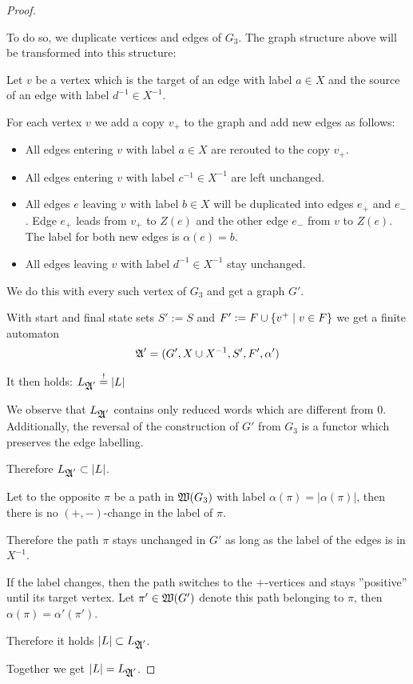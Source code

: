 \begin{proof}
\begin{center}

\end{center}

To do so, we duplicate vertices and edges of $G_3$. The graph structure
above will be transformed into this structure:

\begin{center}

\end{center}

Let $v$ be a vertex which is the target of an edge with label $a \in X$ and the
source of an edge with label $d^{-1} \in X^{-1}$.

For each vertex $v$ we add a copy $v_{+}$ to the graph and add new edges as
follows:
\begin{itemize}
  \item All edges entering $v$ with label $a \in X$ are rerouted to the copy
  $v_{+}$.
  \item All edges entering $v$ with label $c^{-1} \in X^{-1}$ are left
  unchanged.
  \item All edges $e$ leaving $v$ with label $b \in X$ will be
  duplicated into edges $e_{+}$ and $e_{-}$. Edge $e_{+}$ leads from $v_{+}$
  to $Z(e)$ and the other edge $e_{-}$ from $v$ to $Z(e)$. The label for
  both new edges is $\alpha(e) = b$.
	\item All edges leaving $v$ with label $d^{-1} \in X^{-1}$ stay unchanged.
\end{itemize}
We do this with every such vertex of $G_3$ and get a graph $G'$.

With start and final state sets $S' := S$ and $F' := F \cup \mbox{$\{v^+ \mid v
\in F\}$}$ we get a finite automaton
\[ \mbox{$\mathfrak{A}$}' = (G', X \cup {X}^{-1}, S', F', \alpha') \]

It then holds: $L_{\mbox{$\mathfrak{A}$}'} \stackrel{!}{=} |L|$

We observe that $L_{\mbox{$\mathfrak{A}$}'}$ contains only reduced words which are different
from $0$. Additionally, the reversal of the construction of $G'$ from $G_3$ is a
functor which preserves the edge labelling.

Therefore $L_{\mbox{$\mathfrak{A}$}'} \subset |L|$.

\bigskip
Let to the opposite $\pi$ be a path in $\mbox{$\mathfrak{W}(G_3)$}$ with label $\alpha(\pi)
= |\alpha(\pi)|$, then there is no $(+, -)$-change in the label of $\pi$.

Therefore the path $\pi$ stays unchanged in $G'$ as long as the label
of the edges is in $X^{-1}$.

If the label changes, then the path switches to the $+$-vertices and stays
''positive'' until its target vertex. Let $\pi' \in \mbox{$\mathfrak{W}(G')$}$ denote this
path belonging to $\pi$, then $\alpha(\pi) = \alpha'(\pi')$.

Therefore it holds $|L| \subset L_{\mbox{$\mathfrak{A}$}'}$.

Together we get $|L| = L_{\mbox{$\mathfrak{A}$}'}$.
\end{proof}

